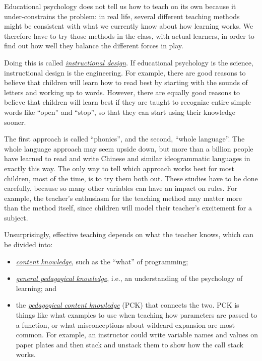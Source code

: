 \documentclass[10pt,statementpaper]{memoir}
\begin{document}
Educational psychology does not tell us how to teach on its own because
it under-constrains the problem: in real life, several different
teaching methods might be consistent with what we currently know about
how learning works. We therefore have to try those methods in the class,
with actual learners, in order to find out how well they balance the
different forces in play.

Doing this is called
\emph{\href{gloss.html\#instructional-design}{instructional design}}. If
educational psychology is the science, instructional design is the
engineering. For example, there are good reasons to believe that
children will learn how to read best by starting with the sounds of
letters and working up to words. However, there are equally good reasons
to believe that children will learn best if they are taught to recognize
entire simple words like ``open'' and ``stop'', so that they can start
using their knowledge sooner.

The first approach is called ``phonics'', and the second, ``whole
language''. The whole language approach may seem upside down, but more
than a billion people have learned to read and write Chinese and similar
ideogrammatic languages in exactly this way. The only way to tell which
approach works best for most children, most of the time, is to try them
both out. These studies have to be done carefully, because so many other
variables can have an impact on rules. For example, the teacher's
enthusiasm for the teaching method may matter more than the method
itself, since children will model their teacher's excitement for a
subject.

Unsurprisingly, effective teaching depends on what the teacher knows,
which can be divided into:

\begin{itemize}
\item
  \emph{\href{gloss.html\#content-knowledge}{content knowledge}}, such
  as the ``what'' of programming;
\item
  \emph{\href{gloss.html\#general-pedagogical-knowledge}{general
  pedagogical knowledge}}, i.e., an understanding of the psychology of
  learning; and
\item
  the \emph{\href{gloss.html\#pedagogical-content-knowledge}{pedagogical
  content knowledge}} (PCK) that connects the two. PCK is things like
  what examples to use when teaching how parameters are passed to a
  function, or what misconceptions about wildcard expansion are most
  common. For example, an instructor could write variable names and
  values on paper plates and then stack and unstack them to show how the
  call stack works.
\end{itemize}
\end{document}
